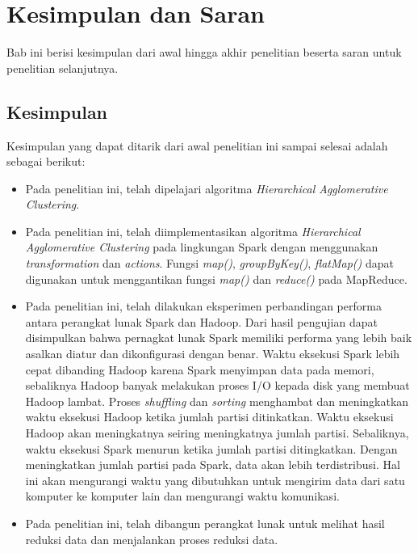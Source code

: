 \chapter{Kesimpulan dan Saran}

Bab ini berisi kesimpulan dari awal hingga akhir penelitian beserta saran untuk penelitian selanjutnya.

\section{Kesimpulan}

Kesimpulan yang dapat ditarik dari awal penelitian ini sampai selesai adalah sebagai berikut:

\begin{itemize}

\item Pada penelitian ini, telah dipelajari algoritma  {\it Hierarchical Agglomerative Clustering}.

\item Pada penelitian ini, telah diimplementasikan algoritma {\it Hierarchical Agglomerative Clustering} pada lingkungan Spark dengan menggunakan \textit{transformation} dan \textit{actions}. Fungsi \textit{map()}, \textit{groupByKey()}, \textit{flatMap()} dapat digunakan untuk menggantikan fungsi \textit{map()} dan \textit{reduce()} pada MapReduce.

\item Pada penelitian ini, telah dilakukan eksperimen perbandingan performa antara perangkat lunak Spark dan Hadoop. Dari hasil pengujian dapat disimpulkan bahwa pernagkat lunak Spark memiliki performa yang lebih baik asalkan diatur dan dikonfigurasi dengan benar. Waktu eksekusi Spark lebih cepat dibanding Hadoop karena Spark menyimpan data pada memori, sebaliknya Hadoop banyak melakukan proses I/O kepada disk yang membuat Hadoop lambat. Proses \textit{shuffling} dan \textit{sorting} menghambat dan meningkatkan waktu eksekusi Hadoop ketika jumlah partisi ditinkatkan. Waktu eksekusi Hadoop akan meningkatnya seiring meningkatnya jumlah partisi. Sebaliknya, waktu eksekusi Spark menurun ketika jumlah partisi ditingkatkan. Dengan meningkatkan jumlah partisi pada Spark, data akan lebih terdistribusi. Hal ini akan mengurangi waktu yang dibutuhkan untuk mengirim data dari satu komputer ke komputer lain dan mengurangi waktu komunikasi. 

\item Pada penelitian ini, telah dibangun perangkat lunak untuk melihat hasil reduksi data dan menjalankan proses reduksi data. 

\end{itemize}

